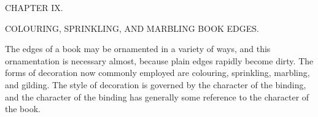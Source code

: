 \documentclass[twoside]{book}
\begin{document}
\pagebreak


\thispagestyle{empty}

\vspace*{\fill}

\begin{center}

\begin{large}CHAPTER IX.\end{large}

\begin{small}COLOURING, SPRINKLING, AND MARBLING BOOK EDGES.\end{small}

\end{center}

\noindent
The edges of a book may be ornamented in a
variety of ways, and this ornamentation is necessary
almost, because plain edges rapidly become dirty.
The forms of decoration now commonly employed
are colouring, sprinkling, marbling, and gilding.
The style of decoration is governed by the character
of the binding, and the character of the binding has
generally some reference to the character of the
book.
\end{document}
